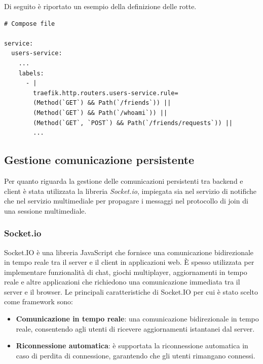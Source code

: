 Di seguito è riportato un esempio della definizione delle rotte.

\begin{verbatim}
# Compose file

service:
  users-service:
    ...
    labels:
      - |
        traefik.http.routers.users-service.rule=
        (Method(`GET`) && Path(`/friends`)) ||
        (Method(`GET`) && Path(`/whoami`)) ||
        (Method(`GET`, `POST`) && Path(`/friends/requests`)) ||
        ...
\end{verbatim}

%
%
%
\subsection{Gestione comunicazione persistente}

Per quanto riguarda la gestione delle comunicazioni persistenti tra backend e client è stata utilizzata la libreria \emph{Socket.io}, impiegata sia nel servizio di notifiche che nel servizio multimediale per propagare i messaggi nel protocollo di join di una sessione multimediale.

%
%
%
\subsubsection{Socket.io}

Socket.IO è una libreria JavaScript che fornisce una comunicazione bidirezionale in tempo reale tra il server e il client in applicazioni web.
%
È spesso utilizzata per implementare funzionalità di chat, giochi multiplayer, aggiornamenti in tempo reale e altre applicazioni che richiedono una comunicazione immediata tra il server e il browser.
%
Le principali caratteristiche di Socket.IO per cui è stato scelto come framework sono:

\begin{itemize}
    \item \textbf{Comunicazione in tempo reale}: una comunicazione bidirezionale in tempo reale, consentendo agli utenti di ricevere aggiornamenti istantanei dal server.



    \item \textbf{Riconnessione automatica}: è supportata la riconnessione automatica in caso di perdita di connessione, garantendo che gli utenti rimangano connessi.


\end{itemize}

